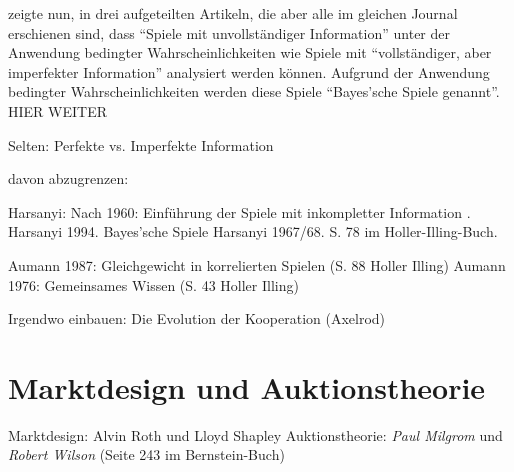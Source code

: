 \textcite{Harsanyi1967} zeigte nun, in drei aufgeteilten Artikeln, die aber alle im gleichen Journal erschienen sind, dass "`Spiele mit unvollständiger Information"' unter der Anwendung bedingter Wahrscheinlichkeiten wie Spiele mit "`vollständiger, aber imperfekter Information"' analysiert werden können. Aufgrund der Anwendung bedingter Wahrscheinlichkeiten werden diese Spiele "`Bayes'sche Spiele genannt"'.  HIER WEITER

Selten:  Perfekte vs. Imperfekte Information





davon abzugrenzen:

Harsanyi: Nach 1960: Einführung der Spiele mit inkompletter Information . Harsanyi 1994.
Bayes'sche Spiele Harsanyi 1967/68. S. 78 im Holler-Illing-Buch.


Aumann 1987: Gleichgewicht in korrelierten Spielen (S. 88 Holler Illing) Aumann 1976: Gemeinsames Wissen (S. 43 Holler Illing)


Irgendwo einbauen: Die Evolution der Kooperation (Axelrod)
\section{Marktdesign und Auktionstheorie}

Marktdesign: Alvin Roth und Lloyd Shapley 
Auktionstheorie: \textit{Paul Milgrom} und \textit{Robert Wilson} (Seite 243 im Bernstein-Buch)



